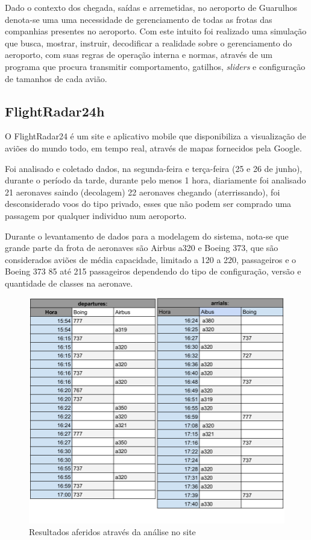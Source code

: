 \documentclass[12pt]{article}
\begin{document}
  Dado o contexto dos chegada, saídas e arremetidas, no aeroporto de Guarulhos denota-se uma
  uma necessidade de gerenciamento de todas as frotas das companhias presentes no aeroporto.
  Com este intuito foi realizado uma simulação que busca, mostrar, instruir, decodificar a
  realidade sobre o gerenciamento do aeroporto, com suas regras de operação interna e normas, 
  através de um programa que procura transmitir comportamento, gatilhos, \textit{sliders} e configuração
  de tamanhos de cada avião.
  
  \subsection{FlightRadar24h}
  
  O FlightRadar24 é um site e aplicativo mobile que disponibiliza a
  visualização de aviões do mundo todo, em tempo real, através de mapas 
  fornecidos pela Google.
  
  Foi analisado e coletado dados, na segunda-feira e terça-feira (25 e 26 de junho), durante 
  o período da tarde, durante pelo menos 1 hora, diariamente foi analisado 21
  aeronaves saindo (decolagem) 22 aeronaves chegando (aterrissando), foi desconsiderado voos do 
  tipo privado, esses que não podem ser comprado uma passagem por qualquer
  individuo num aeroporto.
  
  Durante o levantamento de dados para a modelagem do sistema, nota-se que grande parte
  da frota de aeronaves são Airbus a320 e Boeing 373, que são considerados aviões de média
  capacidade, limitado a 120 a 220, passageiros e o Boeing 373 85 até 215 passageiros 
  dependendo do tipo de configuração, versão e quantidade de classes na aeronave.

    \begin{figure}[ht]
      \centering
      \includegraphics[width=.6\textwidth]{dados.png}
      \caption{Resultados aferidos através da análise no site}
      \label{fig:saida}
    \end{figure}
  
\end{document}
